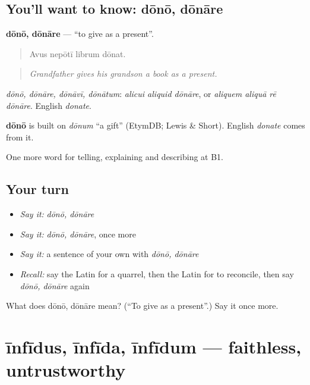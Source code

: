 \subsection*{You'll want to know: dōnō, dōnāre}
\textbf{dōnō, dōnāre} — \textquotedblleft{}to give as a present\textquotedblright{}.

\begin{quote}
Avus nepōtī librum dōnat.
\end{quote}

\begin{quote}
\emph{Grandfather gives his grandson a book as a present.}
\end{quote}

\emph{dōnō, dōnāre, dōnāvī, dōnātum}: \emph{alicui aliquid dōnāre}, or \emph{aliquem aliquā rē dōnāre}. English \emph{donate}.

\begin{cousinweb}
\textbf{dōnō} is built on \emph{dōnum} \textquotedblleft{}a gift\textquotedblright{} (EtymDB; Lewis \& Short). English \emph{donate} comes from it.
\end{cousinweb}

\begin{grammarlens}[title={What you've built}]
One more word for telling, explaining and describing at B1.
\end{grammarlens}

\subsection*{Your turn}
\begin{itemize}
\raggedright
  \item \emph{Say it:} \emph{dōnō, dōnāre}
  \item \emph{Say it:} \emph{dōnō, dōnāre}, once more
  \item \emph{Say it:} a sentence of your own with \emph{dōnō, dōnāre}
  \item \emph{Recall:} say the Latin for a quarrel, then the Latin for to reconcile, then say \emph{dōnō, dōnāre} again
\end{itemize}

\begin{tcolorbox}[breakable,colback=teal!4,colframe=teal!35!black,title={Before you move on}]
What does dōnō, dōnāre mean? (\textquotedblleft{}To give as a present\textquotedblright{}.) Say it once more.
\end{tcolorbox}
\section[īnfīdus, īnfīda, īnfīdum]{īnfīdus, īnfīda, īnfīdum — faithless, untrustworthy}

